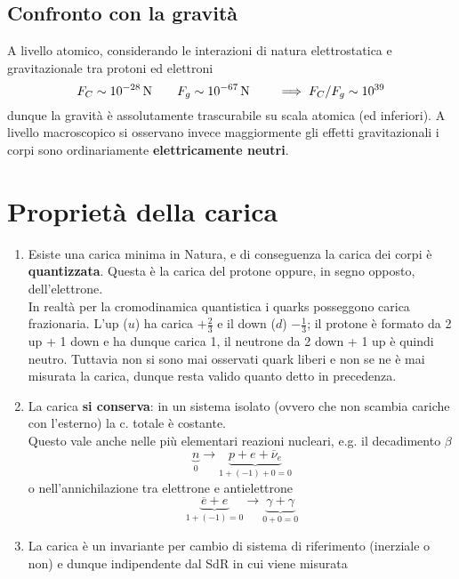 \subsection{Confronto con la gravità}
A livello atomico, considerando le interazioni di natura elettrostatica e gravitazionale tra protoni ed elettroni
\[F_C \sim 10^{-28} \newton \qquad F_g \sim 10^{-67} \newton \qquad \implies F_C / F_g \sim 10^{39}\]
dunque la gravità è assolutamente trascurabile su scala atomica (ed inferiori). A livello macroscopico si osservano invece maggiormente gli effetti gravitazionali i corpi sono ordinariamente \textbf{elettricamente neutri}.

\section{Proprietà della carica}
\begin{enumerate}
\item Esiste una carica minima in Natura, e di conseguenza la carica dei corpi è \textbf{quantizzata}. Questa è la carica del protone oppure, in segno opposto, dell'elettrone.
\\In realtà per la cromodinamica quantistica i quarks posseggono carica frazionaria. L'up ($u$) ha carica $+ \frac{2}{3}$ e il down ($d$) $- \frac{1}{3}$; il protone è formato da 2 up + 1 down e ha dunque carica 1, il neutrone da 2 down + 1 up è quindi neutro. Tuttavia non si sono mai osservati quark liberi e non se ne è mai misurata la carica, dunque resta valido quanto detto in precedenza.

\item La carica \textbf{si conserva}: in un sistema isolato (ovvero che non scambia cariche con l'esterno) la c. totale è costante.
\\Questo vale anche nelle più elementari reazioni nucleari, e.g. il decadimento $\beta$
\[\underbrace{n}_{0} \rightarrow \underbrace{p + e + \overline{\nu}_e}_{1+(-1) + 0 = 0}\]
o nell'annichilazione tra elettrone e antielettrone
\[\underbrace{\overline{e} + e}_{1+(-1) = 0} \rightarrow \underbrace{\gamma + \gamma}_{0 + 0 = 0}\]

\item La carica è un invariante per cambio di sistema di riferimento (inerziale o non) e dunque indipendente dal SdR in cui viene misurata
\end{enumerate}

